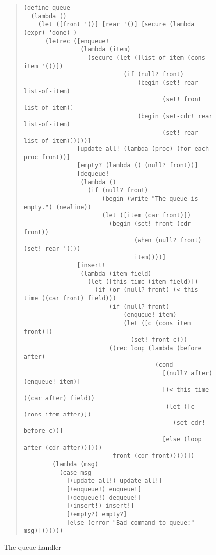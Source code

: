 \begin{figure}
\begin{frameit}
\begin{quote}
\begin{verbatim}
(define queue
  (lambda ()
    (let ([front '()] [rear '()] [secure (lambda (expr) 'done)])
      (letrec ([enqueue!
                (lambda (item)
                  (secure (let ([list-of-item (cons item '())])
                            (if (null? front)
                                (begin (set! rear list-of-item)
                                       (set! front list-of-item))
                                (begin (set-cdr! rear list-of-item)
                                       (set! rear list-of-item))))))]
               [update-all! (lambda (proc) (for-each proc front))]
               [empty? (lambda () (null? front))]
               [dequeue!
                (lambda ()
                  (if (null? front)
                      (begin (write "The queue is empty.") (newline))
                      (let ([item (car front)])
                        (begin (set! front (cdr front))
                               (when (null? front) (set! rear '()))
                               item))))]
               [insert!
                (lambda (item field)
                  (let ([this-time (item field)])
                    (if (or (null? front) (< this-time ((car front) field)))
                        (if (null? front)
                            (enqueue! item)
                            (let ([c (cons item front)])
                              (set! front c)))
                        ((rec loop (lambda (before after)
                                     (cond
                                       [(null? after) (enqueue! item)]
                                       [(< this-time ((car after) field))
                                        (let ([c (cons item after)])
                                          (set-cdr! before c))]
                                       [else (loop after (cdr after))])))
                         front (cdr front)))))])
        (lambda (msg)
          (case msg
            [(update-all!) update-all!]
            [(enqueue!) enqueue!]
            [(dequeue!) dequeue!]
            [(insert!) insert!]
            [(empty?) empty?]
            [else (error "Bad command to queue:" msg)]))))))
\end{verbatim}
\end{quote}
\caption{The queue handler}
\label{fig:queue}
\end{frameit}
\end{figure}

